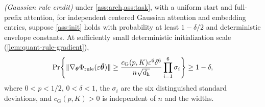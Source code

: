\item \emph{(Gaussian rule credit)} under \cref{ass:arch,ass:task}, with a uniform start
and full-prefix attention, for independent centered Gaussian
attention and embedding entries, suppose \cref{ass:init} holds with probability
at least $1-\delta/2$ and deterministic envelope constants. At sufficiently
small deterministic initialization scale (\cref{lem:quant-rule-gradient}),
\[
 \Pr\!\left\{\|\nabla_{\bm\theta}\Phi_{\mathrm{rule}}(\varepsilon\tilde{\bm\theta})\|
 \ge\frac{c_{\mathrm G}(p,K)\varepsilon^6\delta^6}{n\sqrt{d_{\mathrm h}}}
 \prod_{i=1}^6\sigma_i\right\}\ge1-\delta,
\]
where $0<p<1/2$, $0<\delta<1$, the $\sigma_i$ are the six distinguished
standard deviations, and $c_{\mathrm G}(p,K)>0$ is independent of $n$ and the widths.
